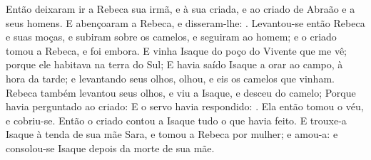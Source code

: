 {{  Então deixaram ir a Rebeca sua irmã, e à sua criada, e ao criado de Abraão e a seus homens.
  E abençoaram a Rebeca, e disseram-lhe: .
  Levantou-se então Rebeca e suas moças, e subiram sobre os camelos, e seguiram ao homem; e o criado tomou a Rebeca, e foi embora.
  E vinha Isaque do poço do Vivente que me vê; porque ele habitava na terra do Sul;
  E havia saído Isaque a orar ao campo, à hora da tarde; e levantando seus olhos, olhou, e eis os camelos que vinham.
  Rebeca também levantou seus olhos, e viu a Isaque, e desceu do camelo;
  Porque havia perguntado ao criado:  E o servo havia respondido: . Ela então tomou o véu, e cobriu-se.
  Então o criado contou a Isaque tudo o que havia feito.
  E trouxe-a Isaque à tenda de sua mãe Sara, e tomou a Rebeca por mulher; e amou-a: e consolou-se Isaque depois da morte de sua mãe.
\par }

}
